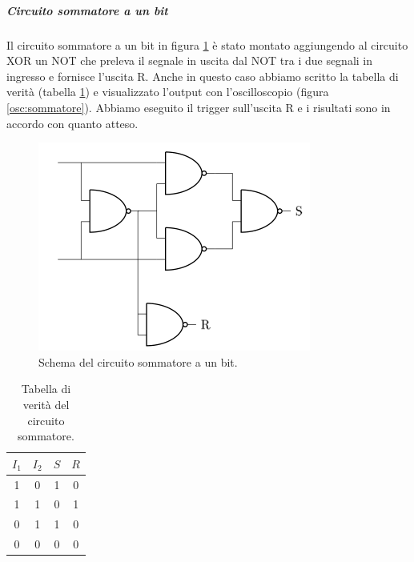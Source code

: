 \documentclass[10pt,a4paper]{article}
\begin{document}
\subparagraph{Circuito sommatore a un bit}
Il circuito sommatore a un bit in figura \ref{fig:sommatore} è stato montato aggiungendo al circuito XOR un NOT che preleva il segnale in uscita dal NOT tra i due segnali in ingresso e fornisce l'uscita R. Anche in questo caso abbiamo scritto la tabella di verità (tabella \ref{tab:sommatore}) e visualizzato l'output con l'oscilloscopio (figura \ref{osc:sommatore}). Abbiamo eseguito il trigger sull'uscita R e i risultati sono in accordo con quanto atteso.



\begin{figure}[!htb]
  \centering
  \includegraphics[scale=0.5]{sommatore.png}
\caption{Schema del circuito sommatore a un bit.\label{fig:sommatore}}
\end{figure}

\begin{table}[!htb]
\centering
\begin{tabular}{|c|c|c|c|}
\hline 
$I_1$ & $I_2$ & $S$ & $R$\\
\hline
 1 &  0 & 1 & 0\\ 
 
 1 &  1 & 0 & 1\\ 

 0 &  1 & 1 & 0\\ 
 
 0 &  0 & 0 & 0\\ 
\hline 
\end{tabular} 
\caption{Tabella di verità del circuito sommatore.\label{tab:sommatore}}
\end{table}
\end{document}
